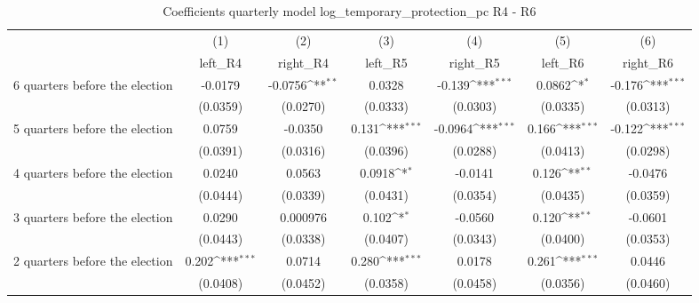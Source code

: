 \begin{table}[htbp]\centering
\def\sym#1{\ifmmode^{#1}\else\(^{#1}\)\fi}
\caption{Coefficients quarterly model log\_temporary\_protection\_pc R4 - R6}
\begin{tabular}{l*{6}{c}}
\hline\hline
                    &\multicolumn{1}{c}{(1)}&\multicolumn{1}{c}{(2)}&\multicolumn{1}{c}{(3)}&\multicolumn{1}{c}{(4)}&\multicolumn{1}{c}{(5)}&\multicolumn{1}{c}{(6)}\\
                    &\multicolumn{1}{c}{left\_R4}&\multicolumn{1}{c}{right\_R4}&\multicolumn{1}{c}{left\_R5}&\multicolumn{1}{c}{right\_R5}&\multicolumn{1}{c}{left\_R6}&\multicolumn{1}{c}{right\_R6}\\
\hline
 6 quarters before the election&     -0.0179         &     -0.0756\sym{**} &      0.0328         &      -0.139\sym{***}&      0.0862\sym{*}  &      -0.176\sym{***}\\
                    &    (0.0359)         &    (0.0270)         &    (0.0333)         &    (0.0303)         &    (0.0335)         &    (0.0313)         \\
[1em]
 5 quarters before the election&      0.0759         &     -0.0350         &       0.131\sym{***}&     -0.0964\sym{***}&       0.166\sym{***}&      -0.122\sym{***}\\
                    &    (0.0391)         &    (0.0316)         &    (0.0396)         &    (0.0288)         &    (0.0413)         &    (0.0298)         \\
[1em]
 4 quarters before the election&      0.0240         &      0.0563         &      0.0918\sym{*}  &     -0.0141         &       0.126\sym{**} &     -0.0476         \\
                    &    (0.0444)         &    (0.0339)         &    (0.0431)         &    (0.0354)         &    (0.0435)         &    (0.0359)         \\
[1em]
 3 quarters before the election&      0.0290         &    0.000976         &       0.102\sym{*}  &     -0.0560         &       0.120\sym{**} &     -0.0601         \\
                    &    (0.0443)         &    (0.0338)         &    (0.0407)         &    (0.0343)         &    (0.0400)         &    (0.0353)         \\
[1em]
 2 quarters before the election&       0.202\sym{***}&      0.0714         &       0.280\sym{***}&      0.0178         &       0.261\sym{***}&      0.0446         \\
                    &    (0.0408)         &    (0.0452)         &    (0.0358)         &    (0.0458)         &    (0.0356)         &    (0.0460)         \\

\end{tabular}
\end{table}
